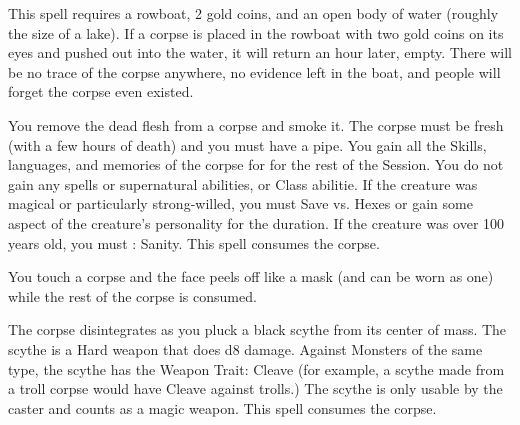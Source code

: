{\NECRO[
  Name=Charon's Price,
  Link=necromancy-charon-price,
  Paradigm=Death,
  Save=N,
  Duration=0,
  Mod=+6,
  Keywords=None,
  Target=Corpse in a boat
]


This spell requires a rowboat, 2 gold coins, and an open body of water (roughly the size of a lake).  If a corpse is placed in the rowboat with two gold coins on its eyes and pushed out into the water, it will return an hour later, empty. There will be no trace of the corpse anywhere, no evidence left in the boat, and people will forget the corpse even existed.

\NECRO[
  Name=Corpse Smoke,
  Link=necromancy-corpse-smoke,
  Paradigm=Death,
  Save=N,
  Duration=0,
  Mod=+3,
  Keywords=None,
  Target=Close (touch) Mortal corpse
]


You remove the dead flesh from a corpse and smoke it.  The corpse must be fresh (with a few hours of death) and you must have a pipe.   You gain all the Skills, languages, and memories of the corpse for for the rest of the Session.  You do not gain any spells or supernatural abilities, or Class abilitie. If the creature was magical or particularly strong-willed, you must Save vs. Hexes or gain some aspect of the creature's personality for the duration. If the creature was over 100 years old, you must \RS : Sanity.  This spell consumes the corpse.

\NECRO[
  Name=Death Mask,
  Link=necromancy-death-mask,
  Paradigm=Death,
  Save=N,
  Duration=Permanent,
  Mod=+9,
  Keywords=None,
  Target=Close (touch) corpse
]


You touch a corpse and the face peels off like a mask (and can be worn as one) while the rest of the corpse is consumed.

\NECRO[
  Name=Death Scythe,
  Link=necromancy-death-scythe
  Paradigm=Death,
  Save=N,
  Duration=Combat or \LVL Minutes,
  Mod=+3,
  Keywords=None,
  Target=Close (touch) corpse
]


The corpse disintegrates as you pluck a black scythe from its center of mass. The scythe is a Hard weapon that does d8 damage.  Against Monsters of the same type, the scythe has the Weapon Trait: Cleave (for example, a scythe made from a troll corpse would have Cleave against trolls.) The scythe is only usable by the caster and counts as a magic weapon. This spell consumes the corpse.

\NECRO[
  Name=Essential Salt,
  Link=necromancy-essential-salt,
  Paradigm=Death,
  Save=N,
  Duration=Permanent,
  Mod=+9,
  Keywords=None,
  Target=Close (touch) corpse
]


}
